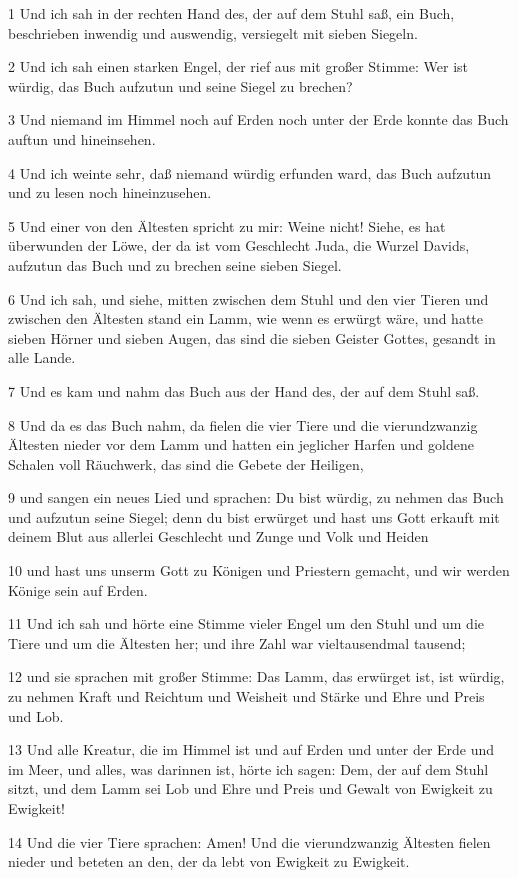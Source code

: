 \par 1 Und ich sah in der rechten Hand des, der auf dem Stuhl saß, ein Buch, beschrieben inwendig und auswendig, versiegelt mit sieben Siegeln.
\par 2 Und ich sah einen starken Engel, der rief aus mit großer Stimme: Wer ist würdig, das Buch aufzutun und seine Siegel zu brechen?
\par 3 Und niemand im Himmel noch auf Erden noch unter der Erde konnte das Buch auftun und hineinsehen.
\par 4 Und ich weinte sehr, daß niemand würdig erfunden ward, das Buch aufzutun und zu lesen noch hineinzusehen.
\par 5 Und einer von den Ältesten spricht zu mir: Weine nicht! Siehe, es hat überwunden der Löwe, der da ist vom Geschlecht Juda, die Wurzel Davids, aufzutun das Buch und zu brechen seine sieben Siegel.
\par 6 Und ich sah, und siehe, mitten zwischen dem Stuhl und den vier Tieren und zwischen den Ältesten stand ein Lamm, wie wenn es erwürgt wäre, und hatte sieben Hörner und sieben Augen, das sind die sieben Geister Gottes, gesandt in alle Lande.
\par 7 Und es kam und nahm das Buch aus der Hand des, der auf dem Stuhl saß.
\par 8 Und da es das Buch nahm, da fielen die vier Tiere und die vierundzwanzig Ältesten nieder vor dem Lamm und hatten ein jeglicher Harfen und goldene Schalen voll Räuchwerk, das sind die Gebete der Heiligen,
\par 9 und sangen ein neues Lied und sprachen: Du bist würdig, zu nehmen das Buch und aufzutun seine Siegel; denn du bist erwürget und hast uns Gott erkauft mit deinem Blut aus allerlei Geschlecht und Zunge und Volk und Heiden
\par 10 und hast uns unserm Gott zu Königen und Priestern gemacht, und wir werden Könige sein auf Erden.
\par 11 Und ich sah und hörte eine Stimme vieler Engel um den Stuhl und um die Tiere und um die Ältesten her; und ihre Zahl war vieltausendmal tausend;
\par 12 und sie sprachen mit großer Stimme: Das Lamm, das erwürget ist, ist würdig, zu nehmen Kraft und Reichtum und Weisheit und Stärke und Ehre und Preis und Lob.
\par 13 Und alle Kreatur, die im Himmel ist und auf Erden und unter der Erde und im Meer, und alles, was darinnen ist, hörte ich sagen: Dem, der auf dem Stuhl sitzt, und dem Lamm sei Lob und Ehre und Preis und Gewalt von Ewigkeit zu Ewigkeit!
\par 14 Und die vier Tiere sprachen: Amen! Und die vierundzwanzig Ältesten fielen nieder und beteten an den, der da lebt von Ewigkeit zu Ewigkeit.

